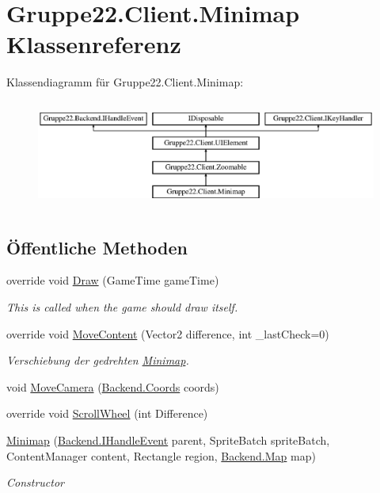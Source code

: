 \hypertarget{class_gruppe22_1_1_client_1_1_minimap}{\section{Gruppe22.\-Client.\-Minimap Klassenreferenz}
\label{class_gruppe22_1_1_client_1_1_minimap}
}
Klassendiagramm für Gruppe22.\-Client.\-Minimap\-:\begin{figure}[H]
\begin{center}
\leavevmode
\includegraphics[height=3.589744cm]{class_gruppe22_1_1_client_1_1_minimap}
\end{center}
\end{figure}
\subsection*{Öffentliche Methoden}
\begin{DoxyCompactItemize}
\item 
override void \hyperlink{class_gruppe22_1_1_client_1_1_minimap_a32a69f8d0569dd31183d57cb04006e10}{Draw} (Game\-Time game\-Time)
\begin{DoxyCompactList}\small\item\em This is called when the game should draw itself. \end{DoxyCompactList}\item 
override void \hyperlink{class_gruppe22_1_1_client_1_1_minimap_abe87f3a3827b72df0106e5839ff9ee21}{Move\-Content} (Vector2 difference, int \-\_\-last\-Check=0)
\begin{DoxyCompactList}\small\item\em Verschiebung der gedrehten \hyperlink{class_gruppe22_1_1_client_1_1_minimap}{Minimap}. \end{DoxyCompactList}\item 
void \hyperlink{class_gruppe22_1_1_client_1_1_minimap_ad4ed9b7a0732776cbbd9a919bb087ba7}{Move\-Camera} (\hyperlink{class_gruppe22_1_1_backend_1_1_coords}{Backend.\-Coords} coords)
\item 
override void \hyperlink{class_gruppe22_1_1_client_1_1_minimap_a300b7045139787e2f35a0807793e8bc0}{Scroll\-Wheel} (int Difference)
\item 
\hyperlink{class_gruppe22_1_1_client_1_1_minimap_a23e6850c1ea74b948b47680a07749e08}{Minimap} (\hyperlink{interface_gruppe22_1_1_backend_1_1_i_handle_event}{Backend.\-I\-Handle\-Event} parent, Sprite\-Batch sprite\-Batch, Content\-Manager content, Rectangle region, \hyperlink{class_gruppe22_1_1_backend_1_1_map}{Backend.\-Map} map)
\begin{DoxyCompactList}\small\item\em Constructor \end{DoxyCompactList}\end{DoxyCompactItemize}
